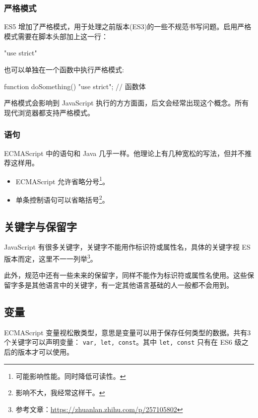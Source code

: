 \subsubsection{严格模式}

ES5 增加了严格模式，用于处理之前版本(ES3)的一些不规范书写问题。启用严格模式需要在脚本头部加上这一行：

\begin{JavaScript}
"use strict"
\end{JavaScript}

也可以单独在一个函数中执行严格模式:

\begin{JavaScript}
function doSomething() {
    "use strict";
    // 函数体
}
\end{JavaScript}

严格模式会影响到 JavaScript 执行的方方面面，后文会经常出现这个概念。所有现代浏览器都支持严格模式。

\subsubsection{语句}

ECMAScript 中的语句和 Java 几乎一样。他理论上有几种宽松的写法，但并不推荐这样用。

\begin{itemize}
    \item ECMAScript 允许省略分号\footnote{可能影响性能。同时降低可读性。}。
    \item 单条控制语句可以省略括号\footnote{影响不大，我经常这样干。}。
\end{itemize}

\subsection{关键字与保留字}

JavaScript 有很多关键字，关键字不能用作标识符或属性名，具体的关键字视 ES 版本而定，这里不一一列举\footnote{参考文章：\url{https://zhuanlan.zhihu.com/p/257105802}}。

此外，规范中还有一些未来的保留字，同样不能作为标识符或属性名使用。这些保留字多是其他语言中的关键字，有一定其他语言基础的人一般都不会用到。

\subsection{变量}

ECMAScript 变量视松散类型，意思是变量可以用于保存任何类型的数据。共有3个关键字可以声明变量： \texttt{var, let, const}。其中 \texttt{let, const} 只有在 ES6 级之后的版本才可以使用。

